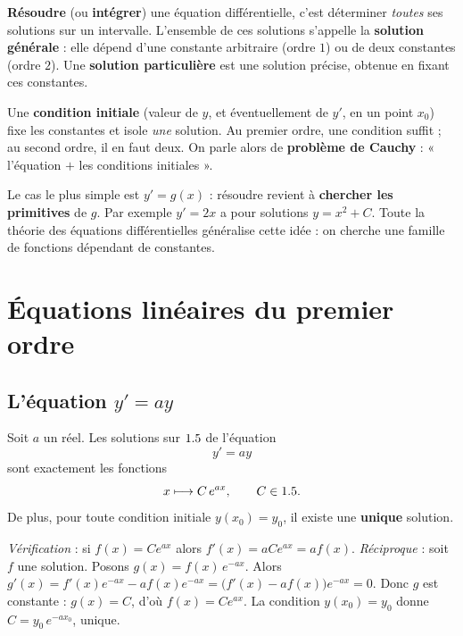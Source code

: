 \begin{definition}
\textbf{Résoudre} (ou \textbf{intégrer}) une équation différentielle, c'est
déterminer \emph{toutes} ses solutions sur un intervalle. L'ensemble de ces
solutions s'appelle la \textbf{solution générale} : elle dépend d'une constante
arbitraire (ordre $1$) ou de deux constantes (ordre $2$). Une \textbf{solution
particulière} est une solution précise, obtenue en fixant ces constantes.
\end{definition}

\begin{remarque}
Une \textbf{condition initiale} (valeur de $y$, et éventuellement de $y'$, en un
point $x_0$) fixe les constantes et isole \emph{une} solution. Au premier ordre,
une condition suffit ; au second ordre, il en faut deux. On parle alors de
\textbf{problème de Cauchy} : « l'équation $+$ les conditions initiales ».
\end{remarque}

\begin{remarque}
Le cas le plus simple est $y'=g(x)$ : résoudre revient à \textbf{chercher les
primitives} de $g$. Par exemple $y'=2x$ a pour solutions $y=x^2+C$. Toute la
théorie des équations différentielles généralise cette idée : on cherche une
famille de fonctions dépendant de constantes.
\end{remarque}

\section{Équations linéaires du premier ordre}

\subsection{L'équation $y'=ay$}

\begin{theoreme}[Équation $y'=ay$]
Soit $a$ un réel. Les solutions sur $1.5$ de l'équation
\[
y'=ay
\]
sont exactement les fonctions
\[
x\longmapsto C\,e^{ax},\qquad C\in1.5.
\]
De plus, pour toute condition initiale $y(x_0)=y_0$, il existe une
\textbf{unique} solution.
\end{theoreme}

\begin{remarque}[Justification]
\emph{Vérification} : si $f(x)=Ce^{ax}$ alors $f'(x)=aCe^{ax}=af(x)$.
\emph{Réciproque} : soit $f$ une solution. Posons $g(x)=f(x)\,e^{-ax}$. Alors
$g'(x)=f'(x)e^{-ax}-a f(x)e^{-ax}=\big(f'(x)-af(x)\big)e^{-ax}=0$. Donc $g$ est
constante : $g(x)=C$, d'où $f(x)=Ce^{ax}$. La condition $y(x_0)=y_0$ donne
$C=y_0\,e^{-ax_0}$, unique.
\end{remarque}

